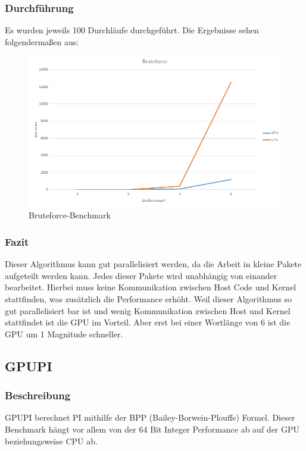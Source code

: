\subsubsection{Durchführung}
Es wurden jeweils 100 Durchläufe durchgeführt.
Die Ergebnisse sehen folgendermaßen aus:
\begin{figure}[!h]
	\begin{center}
		\includegraphics[width=17cm]{images/bruteforce.png}
		\caption{Bruteforce-Benchmark}
	\end{center}
\end{figure}
\subsubsection{Fazit}
Dieser Algorithmus kann gut parallelisiert werden, da die Arbeit in kleine Pakete aufgeteilt werden kann. Jedes dieser Pakete wird unabhängig von einander bearbeitet. Hierbei muss keine Kommunikation zwischen Host Code und Kernel stattfinden, was zusätzlich die Performance erhöht. Weil dieser Algorithmus so gut parallelisiert bar ist und wenig Kommunikation zwischen Host und Kernel stattfindet ist die GPU im Vorteil. Aber erst bei einer Wortlänge von 6 ist die GPU um 1 Magnitude schneller.

\newpage
\subsection{GPUPI}
\subsubsection{Beschreibung}
GPUPI berechnet PI mithilfe der BPP (Bailey-Borwein-Plouffe) Formel. Dieser Benchmark hängt vor allem von der 64 Bit Integer Performance ab auf der GPU beziehungsweise CPU ab.

